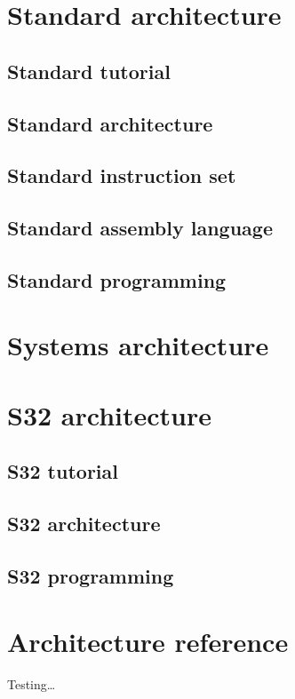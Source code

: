 \documentclass[11pt]{article}
\begin{document}
\section*{Standard architecture}
\label{sec:orgeaed6df}
\subsection*{Standard tutorial}
\label{sec:org364237a}
\subsection*{Standard architecture}
\label{sec:org6a78330}
\subsection*{Standard instruction set}
\label{sec:org9a138a3}
\subsection*{Standard assembly language}
\label{sec:org89ec9c8}
\subsection*{Standard programming}
\label{sec:org0e0cbec}
\section*{Systems architecture}
\label{sec:orgd0715a5}
\section*{S32 architecture}
\label{sec:org64d62f3}
\subsection*{S32 tutorial}
\label{sec:org40370ad}
\subsection*{S32 architecture}
\label{sec:org962e063}
\subsection*{S32 programming}
\label{sec:orgb1ca8c9}
\section*{Architecture reference}
\label{sec:org793768f}
Testing\ldots{}
\end{document}
